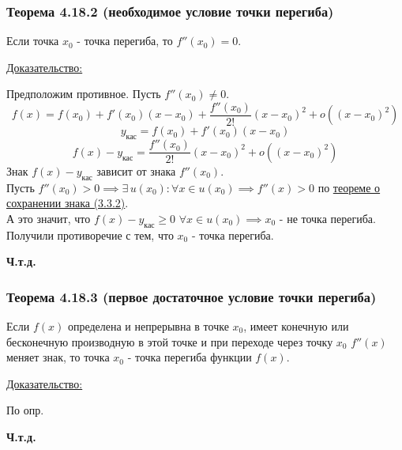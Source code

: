 \documentclass[12pt]{article}
\begin{document}
    \subsubsection*{Теорема 4.18.2 (необходимое условие точки перегиба)}\label{th:4.18.2}
    Если точка $x_0$ - точка перегиба, то $f''(x_0) = 0$.\par\noindent
    \underline{Доказательство:}
    \begin{adjustwidth}{1.5em}{1.5em}
        Предположим противное. Пусть $f''(x_0) \ne 0$.
        \[ f(x) = f(x_0) + f'(x_0)(x-x_0) + \frac{f''(x_0)}{2!}(x-x_0)^2 + o((x-x_0)^2) \]
        \[ y_{\text{кас}} = f(x_0) + f'(x_0)(x-x_0) \]
        \[ f(x)-y_{\text{кас}} = \boxed{\frac{f''(x_0)}{2!}(x-x_0)^2} + o((x-x_0)^2) \]
        Знак $f(x) - y_{\text{кас}}$ зависит от знака $f''(x_0)$.\\
        Пусть $f''(x_0) > 0 \implies \exists\,u(x_0) : \forall x \in u(x_0) \implies f''(x) > 0$ по \hyperref[th:3.3.2]{теореме о сохранении знака (3.3.2)}.\\
        А это значит, что $f(x) - y_{\text{кас}} \ge 0$ $\forall x \in u(x_0) \implies x_0$ - не точка перегиба.\\
        Получили противоречие с тем, что $x_0$ - точка перегиба.
        \begin{center}
            \textbf{Ч.т.д.}
        \end{center}
    \end{adjustwidth}

    \subsubsection*{Теорема 4.18.3 (первое достаточное условие точки перегиба)}\label{th:4.18.3}
    Если $f(x)$ определена и непрерывна в точке $x_0$, имеет конечную или бесконечную производную в этой точке и при переходе через точку $x_0$ $f''(x)$ меняет знак, то точка $x_0$ - точка перегиба функции $f(x)$.\par\noindent
    \underline{Доказательство:}
    \begin{adjustwidth}{1.5em}{1.5em}
        По опр.
    \end{adjustwidth}
    \begin{center}
        \textbf{Ч.т.д.}
    \end{center}
\end{document}
